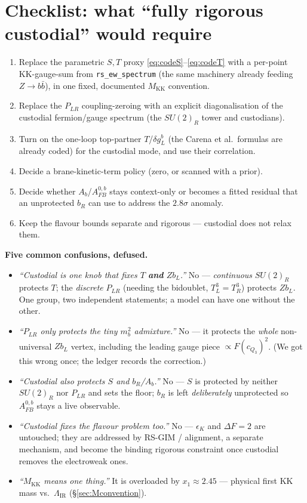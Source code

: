 \documentclass[11pt]{article}
\newenvironment{callout}[1]{%
  \par\medskip\begin{shaded}\noindent\textbf{#1}\par\smallskip}{\end{shaded}\medskip}
\newcommand{\MKK}{M_{\mathrm{KK}}}
\newcommand{\LIR}{\Lambda_{\mathrm{IR}}}
\newcommand{\SUR}{SU(2)_R}
\newcommand{\PLR}{P_{LR}}
\newcommand{\code}[1]{\texttt{#1}}
\newcommand{\dgL}{\delta g_L^b}
\newcommand{\Afb}{A_{FB}^{0,b}}
\theoremstyle{definition}
\begin{document}
\section{Checklist: what ``fully rigorous custodial'' would require}
\begin{enumerate}[leftmargin=1.8em]
\item Replace the parametric $S,T$ proxy \eqref{eq:codeS}--\eqref{eq:codeT} with a
per-point KK-gauge-sum from \code{rs\_ew\_spectrum} (the same machinery already
feeding $Z\to b\bar b$), in one fixed, documented $\MKK$ convention.
\item Replace the $\PLR$ coupling-zeroing with an explicit diagonalisation of the
custodial fermion/gauge spectrum (the $\SUR$ tower and custodians).
\item Turn on the one-loop top-partner $T$/$\dgL$ (the Carena et al.\ formulas are
already coded) for the custodial mode, and use their correlation.
\item Decide a brane-kinetic-term policy (zero, or scanned with a prior).
\item Decide whether $A_b$/$\Afb$ stays context-only or becomes a fitted residual
that an unprotected $b_R$ can use to address the $2.8\sigma$ anomaly.
\item Keep the flavour bounds separate and rigorous --- custodial does not relax
them.
\end{enumerate}

\begin{callout}{Five common confusions, defused.}
\begin{itemize}[leftmargin=1.2em,nosep]
\item[\textbf{A.}] \emph{``Custodial is one knob that fixes $T$ \textbf{and}
$Zb_L$.''} No --- \emph{continuous} $\SUR$ protects $T$; the \emph{discrete} $\PLR$
(needing the bidoublet, $T^3_L=T^3_R$) protects $Zb_L$. One group, two
independent statements; a model can have one without the other.
\item[\textbf{B.}] \emph{``$\PLR$ only protects the tiny $m_b^2$ admixture.''} No
--- it protects the \emph{whole} non-universal $Zb_L$ vertex, including the leading
gauge piece $\propto F(c_{Q_3})^2$. (We got this wrong once; the ledger records
the correction.)
\item[\textbf{C.}] \emph{``Custodial also protects $S$ and $b_R$/$A_b$.''} No ---
$S$ is protected by neither $\SUR$ nor $\PLR$ and sets the floor; $b_R$ is left
\emph{deliberately} unprotected so $\Afb$ stays a live observable.
\item[\textbf{D.}] \emph{``Custodial fixes the flavour problem too.''} No ---
$\epsilon_K$ and $\Delta F=2$ are untouched; they are addressed by RS-GIM /
alignment, a separate mechanism, and become the binding rigorous constraint once
custodial removes the electroweak ones.
\item[\textbf{E.}] \emph{``$\MKK$ means one thing.''} It is overloaded by
$x_1\approx 2.45$ --- physical first KK mass vs.\ $\LIR$ (\S\ref{sec:Mconvention}).
\end{itemize}
\end{callout}
\end{document}
